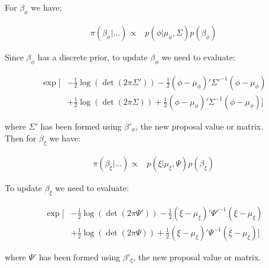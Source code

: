 \documentclass{article}
\begin{document}
\subsubsection*{\pmb{$\beta$}}

For $\beta_\phi$ we have:

\begin{align*}
\pi(\beta_\phi | \dots ) \propto & p(\phi | \mu_\phi, \Sigma) p(\beta_\phi)
\end{align*}

Since $\beta_\phi$ has a discrete prior, to update $\beta_\phi$ we need to evaluate:

\begin{align}
\exp \Big[ & - \frac{1}{2}  \log(\det(2 \pi \Sigma')) -\frac{1}{2} (\phi - \mu_\phi)' \Sigma'^{-1} (\phi - \mu_\phi) \nonumber \\
& + \frac{1}{2} \log(\det(2 \pi \Sigma)) + \frac{1}{2} (\phi - \mu_\phi)' \Sigma^{-1} (\phi - \mu_\phi) \Big] \label{3eq:2b1}
\end{align}

where $\Sigma'$ has been formed using $\beta'_\phi$, the new proposal value or matrix. \\

Then for $\beta_\xi$ we have:

\begin{align*}
\pi(\beta_\xi | \dots ) \propto & p(\xi | \mu_\xi, \Psi) p(\beta_\xi)
\end{align*}

To update $\beta_\xi$ we need to evaluate:

\begin{align}
\exp \Big[ & -\frac{1}{2} \log(\det(2 \pi \Psi')) -\frac{1}{2} (\xi - \mu_\xi)' \Psi'^{-1} (\xi - \mu_\xi) \nonumber \\
& + \frac{1}{2} \log(\det(2 \pi \Psi))+ \frac{1}{2} (\xi - \mu_\xi)' \Psi^{-1} (\xi - \mu_\xi) \Big] \label{3eq:2b2}
\end{align}

where $\Psi'$ has been formed using $\beta'_\xi$, the new proposal value or matrix. \\
\end{document}

